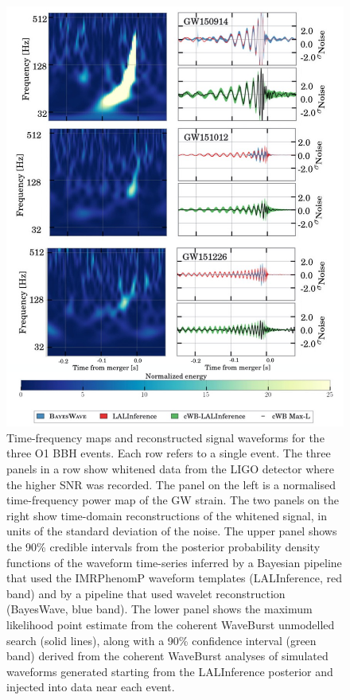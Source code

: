 \documentclass[binding=0.6cm, LaM]{sapthesis}
\begin{document}
        \begin{figure}[!t]
          \label{o1}
          \includegraphics[scale=0.4]{o1}
          \centering
          \caption{Time-frequency maps and reconstructed signal waveforms for the three O1 BBH events. Each row refers to a single event.  The three panels in a row show whitened data from the LIGO detector where the higher SNR was recorded. The panel on the left is a normalised time-frequency power map of the GW strain.  The two panels on the right show time-domain reconstructions of the whitened signal, in units of the standard deviation of the noise. The upper panel shows the 90\% credible intervals from the posterior probability density functions of the waveform time-series inferred by a Bayesian pipeline that used the {\ttfamily IMRPhenomP} waveform templates ({\ttfamily LALInference}, red band) and by a pipeline that used wavelet reconstruction ({\ttfamily BayesWave}, blue band).  The lower panel shows the maximum likelihood point estimate from the {\ttfamily coherent WaveBurst} unmodelled search (solid lines), along with a 90\% confidence interval (green band) derived from the {\ttfamily coherent WaveBurst} analyses of simulated waveforms generated starting from the {\ttfamily LALInference} posterior and injected into data near each event. \cite{13}}
          \label{fig:o1}
        \end{figure}
\end{document}
